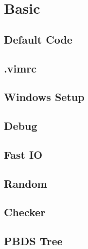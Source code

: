 \documentclass{article}
\begin{document}
\setlength\parindent{0pt}
\setlength\columnseprule{0.5pt}
\footnotesize


\pagestyle{fancy}
\fancyfoot{}
\fancyhead[C]{}

\twocolumn

\tableofcontents

\section{Basic}

\subsection{Default Code}


\subsection{.vimrc}


\subsection{Windows Setup}


\subsection{Debug}


\subsection{Fast IO}


\subsection{Random}


\subsection{Checker}


\subsection{PBDS Tree}

\end{document}
